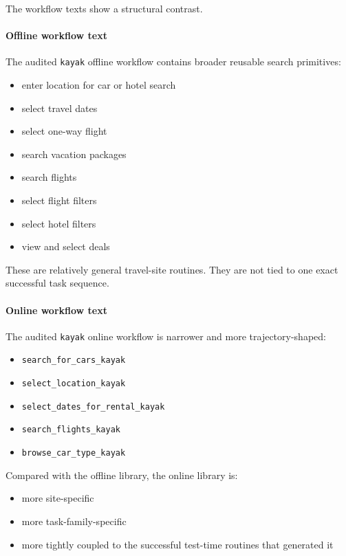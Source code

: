 The workflow texts show a structural contrast.

\paragraph{Offline workflow text}

The audited \texttt{kayak} offline workflow contains broader reusable
search primitives:

\begin{itemize}
\tightlist
\item
  enter location for car or hotel search
\item
  select travel dates
\item
  select one-way flight
\item
  search vacation packages
\item
  search flights
\item
  select flight filters
\item
  select hotel filters
\item
  view and select deals
\end{itemize}

These are relatively general travel-site routines. They are not tied to
one exact successful task sequence.

\paragraph{Online workflow text}

The audited \texttt{kayak} online workflow is narrower and more
trajectory-shaped:

\begin{itemize}
\tightlist
\item
  \texttt{search\_for\_cars\_kayak}
\item
  \texttt{select\_location\_kayak}
\item
  \texttt{select\_dates\_for\_rental\_kayak}
\item
  \texttt{search\_flights\_kayak}
\item
  \texttt{browse\_car\_type\_kayak}
\end{itemize}

Compared with the offline library, the online library is:

\begin{itemize}
\tightlist
\item
  more site-specific
\item
  more task-family-specific
\item
  more tightly coupled to the successful test-time routines that
  generated it
\end{itemize}

